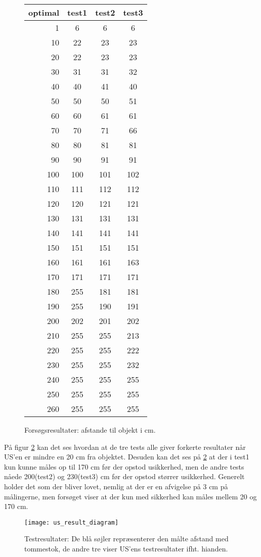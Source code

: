 \begin{figure}[h]
\centering
\begin{tabular}{r | c | c | c |}
optimal & test1 & test2 & test3 \\
\hline
1 & 6 & 6 & 6 \\
10&	22&	23&	23\\
20&	22&	23&	23\\
30&	31&	31&	32\\
40&	40&	41&	40\\
50&	50&	50&	51\\
60&	60&	61&	61\\
70&	70&	71&	66\\
80&	80&	81&	81\\
90&	90&	91&	91\\
100&	100&	101&	102\\
110&	111&	112&	112\\
120&	120&	121&	121\\
130&	131&	131&	131\\
140&	141&	141&	141\\
150&	151&	151&	151\\
160&	161&	161&	163\\
170&	171&	171&	171\\
180&	255&	181&	181\\
190&	255&	190&	191\\
200&	202&	201&	202\\
210&	255&	255&	213\\
220&	255&	255&	222\\
230&	255&	255&	232\\
240&	255&	255&	255\\
250&	255&	255&	255\\
260&	255&	255&	255\\
\end{tabular}
\caption{Forsøgsresultater: afstande til objekt i cm.}
\label{us_data}
\end{figure}

På figur \ref{us_diagram} kan det ses hvordan at de tre tests alle giver forkerte resultater når US'en er mindre en 20 cm fra objektet.
Desuden kan det ses på \ref{us_diagram} at der i test1 kun kunne måles op til 170 cm før der opstod usikkerhed, men de andre tests nåede 200(test2) og 230(test3) cm før der opstod størrer usikkerhed.
Generelt holder det som der bliver lovet, nemlig at der er en afvigelse på 3 cm på målingerne, men forsøget viser at der kun med sikkerhed kan måles mellem 20 og 170 cm.

\begin{figure}[h]
\centering
\texttt{[image: us\_result\_diagram]}
\caption{Testresultater: De blå søjler repræsenterer den målte afstand med tommestok, de andre tre viser US'ens testresultater ifht. hianden.}
\label{us_diagram}
\end{figure}


